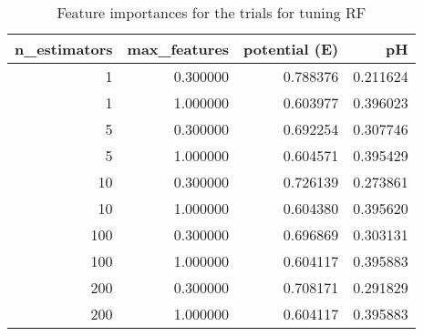 \begin{table}[H]
\centering
\caption{Feature importances for the trials for tuning RF}
\label{feature_imp_RF_tuning}
\begin{tabular}{rrrr}
\toprule
n_estimators & max_features & potential (E) & pH \\
\midrule
1 & 0.300000 & 0.788376 & 0.211624 \\
1 & 1.000000 & 0.603977 & 0.396023 \\
5 & 0.300000 & 0.692254 & 0.307746 \\
5 & 1.000000 & 0.604571 & 0.395429 \\
10 & 0.300000 & 0.726139 & 0.273861 \\
10 & 1.000000 & 0.604380 & 0.395620 \\
100 & 0.300000 & 0.696869 & 0.303131 \\
100 & 1.000000 & 0.604117 & 0.395883 \\
200 & 0.300000 & 0.708171 & 0.291829 \\
200 & 1.000000 & 0.604117 & 0.395883 \\
\bottomrule
\end{tabular}
\end{table}

